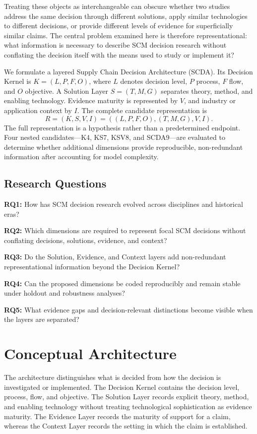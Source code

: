 \documentclass[journal]{IEEEtran}
\begin{document}
Treating these objects as interchangeable can obscure whether two studies address the same decision through different solutions, apply similar technologies to different decisions, or provide different levels of evidence for superficially similar claims. The central problem examined here is therefore representational: what information is necessary to describe SCM decision research without conflating the decision itself with the means used to study or implement it?

We formulate a layered Supply Chain Decision Architecture (SCDA). Its Decision Kernel is \(K=(L,P,F,O)\), where \(L\) denotes decision level, \(P\) process, \(F\) flow, and \(O\) objective. A Solution Layer \(S=(T,M,G)\) separates theory, method, and enabling technology. Evidence maturity is represented by \(V\), and industry or application context by \(I\). The complete candidate representation is
\[
R=(K,S,V,I)=((L,P,F,O),(T,M,G),V,I).
\]
The full representation is a hypothesis rather than a predetermined endpoint. Four nested candidates---K4, KS7, KSV8, and SCDA9---are evaluated to determine whether additional dimensions provide reproducible, non-redundant information after accounting for model complexity.

\subsection{Research Questions}
\textbf{RQ1:} How has SCM decision research evolved across disciplines and historical eras?

\textbf{RQ2:} Which dimensions are required to represent focal SCM decisions without conflating decisions, solutions, evidence, and context?

\textbf{RQ3:} Do the Solution, Evidence, and Context layers add non-redundant representational information beyond the Decision Kernel?

\textbf{RQ4:} Can the proposed dimensions be coded reproducibly and remain stable under holdout and robustness analyses?

\textbf{RQ5:} What evidence gaps and decision-relevant distinctions become visible when the layers are separated?

\section{Conceptual Architecture}
The architecture distinguishes what is decided from how the decision is investigated or implemented. The Decision Kernel contains the decision level, process, flow, and objective. The Solution Layer records explicit theory, method, and enabling technology without treating technological sophistication as evidence maturity. The Evidence Layer records the maturity of support for a claim, whereas the Context Layer records the setting in which the claim is established.
\end{document}
